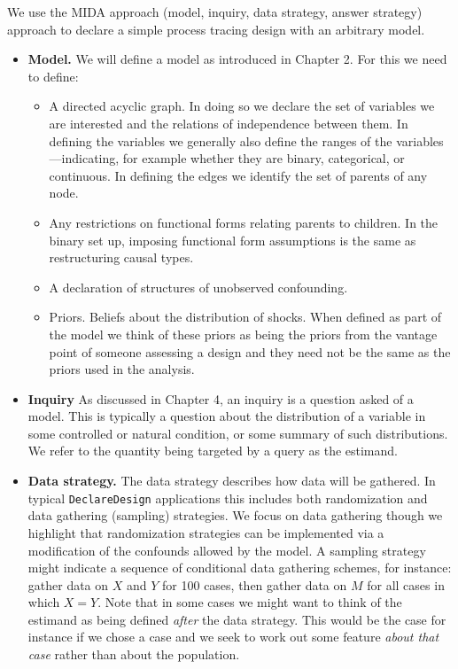 \documentclass[12pt,]{book}
\providecommand{\tightlist}{%
  \setlength{\itemsep}{0pt}\setlength{\parskip}{0pt}}
\begin{document}
We use the MIDA approach (model, inquiry, data strategy, answer strategy) approach to declare a simple process tracing design with an arbitrary model.

\begin{itemize}
\item
  \textbf{Model.} We will define a model as introduced in Chapter 2. For this we need to define:

  \begin{itemize}
  \tightlist
  \item
    A directed acyclic graph. In doing so we declare the set of variables we are interested and the relations of independence between them. In defining the variables we generally also define the ranges of the variables---indicating, for example whether they are binary, categorical, or continuous. In defining the edges we identify the set of parents of any node.
  \item
    Any restrictions on functional forms relating parents to children. In the binary set up, imposing functional form assumptions is the same as restructuring causal types.
  \item
    A declaration of structures of unobserved confounding.\\
  \item
    Priors. Beliefs about the distribution of shocks. When defined as part of the model we think of these priors as being the priors from the vantage point of someone assessing a design and they need not be the same as the priors used in the analysis.
  \end{itemize}
\item
  \textbf{Inquiry} As discussed in Chapter 4, an inquiry is a question asked of a model. This is typically a question about the distribution of a variable in some controlled or natural condition, or some summary of such distributions. We refer to the quantity being targeted by a query as the estimand.
\item
  \textbf{Data strategy.} The data strategy describes how data will be gathered. In typical \texttt{DeclareDesign} applications this includes both randomization and data gathering (sampling) strategies. We focus on data gathering though we highlight that randomization strategies can be implemented via a modification of the confounds allowed by the model. A sampling strategy might indicate a sequence of conditional data gathering schemes, for instance: gather data on \(X\) and \(Y\) for 100 cases, then gather data on \(M\) for all cases in which \(X=Y\).
  Note that in some cases we might want to think of the estimand as being defined \emph{after} the data strategy. This would be the case for instance if we chose a case and we seek to work out some feature \emph{about that case} rather than about the population.

\end{itemize}
\end{document}
